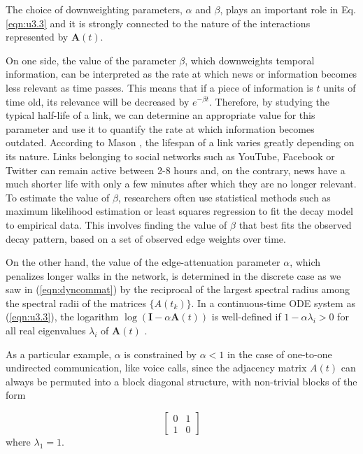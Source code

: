 \begin{highlightedParagraphC}
 
The choice of downweighting parameters, $\alpha$ and $\beta$, plays an important role in Eq. \ref{eqn:u3.3} and it is strongly connected to the nature of the interactions represented by $\mathbf{A}(t)$.

\end{highlightedParagraphC}

On one side, the value of the parameter $\beta$, which downweights temporal information, can be interpreted as the rate at which news or information becomes less relevant as time passes. This means that if a piece of information is $t$ units of time old, its relevance will be decreased by $e^{−\beta t}$. Therefore, by studying the typical half-life of a link, we can determine an appropriate value for this parameter and use it to quantify the rate at which information becomes outdated. According to Mason \cite{lifespan}, the lifespan of a link varies greatly depending on its nature. Links belonging to social networks such as YouTube, Facebook or Twitter can remain active between 2-8 hours and, on the contrary, news have a much shorter life with only a few minutes after which they are no longer relevant. To estimate the value of $\beta$, researchers often use statistical methods such as maximum likelihood estimation or least squares regression to fit the decay model to empirical data. This involves finding the value of $\beta$ that best fits the observed decay pattern, based on a set of observed edge weights over time.

On the other hand, the value of the edge-attenuation parameter $\alpha$, which penalizes longer walks in the network, is determined in the discrete case as we saw in (\ref{eqn:dyncommat}) by the reciprocal of the largest spectral radius among the spectral radii of the matrices $\{A(t_k)\}$. In a continuous-time ODE system as (\ref{eqn:u3.3}), the logarithm $\log(\mathbf{I} - \alpha \mathbf{A}(t))$ is well-defined if $1 - \alpha \lambda_i > 0$ for all real eigenvalues $\lambda_i$ of $\mathbf{A}(t)$ \cite{higham2008functions}.

As a particular example, $\alpha$ is constrained by $\alpha < 1$ in the case of one-to-one undirected communication, like voice calls, since the adjacency matrix $A(t)$ can always be permuted into a block diagonal structure, with non-trivial blocks of the form 

$$\begin{bmatrix}
0 & 1\\
1 & 0 
\end{bmatrix}$$ where $\lambda_1=1$.

